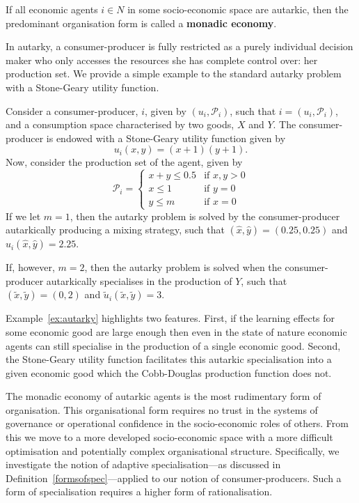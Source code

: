 \begin{subappendices}
\begin{definition}
If all economic agents $i \in N$ in some socio-economic space are autarkic, then the predominant organisation form is called a \textbf{monadic economy}.
\end{definition}
In autarky, a consumer-producer is fully restricted as a purely individual decision maker who only accesses the resources she has complete control over: her production set. We provide a simple example to the standard autarky problem with a Stone-Geary utility function.
\begin{example} \label{ex:autarky}
Consider a consumer-producer, $i$, given by $(u_{i}, \mathcal{P}_i)$, such that $i = (u_{i}, \mathcal{P}_i)$, and a consumption space characterised by two goods, $X$ and $Y$. The consumer-producer is endowed with a Stone-Geary utility function given by
\begin{equation*}
u_{i}(x, y) = (x + 1)(y + 1) .
\end{equation*}
Now, consider the production set of the agent, given by
\[ \mathcal{P}_{i} = \left\{ \begin{array}{ll}
         x + y \leqslant 0.5 & \mbox{if $x,y > 0$}\\
		 x \leqslant 1 & \mbox{if $y = 0$}\\
         y \leqslant m & \mbox{if $x = 0$}\end{array} \right. \]
If we let $m = 1$, then the autarky problem is solved by the consumer-producer autarkically producing a mixing strategy, such that $(\hat{x}, \hat{y}) = (0.25, 0.25)$ and $\hat{u}_{i}(\hat{x}, \hat{y}) = 2.25$.

If, however, $m = 2$, then the autarky problem is solved when the consumer-producer autarkically specialises in the production of $Y$, such that $(\tilde{x}, \tilde{y}) = (0, 2)$ and $\tilde{u}_{i}(\tilde{x}, \tilde{y}) = 3$.
\end{example}
Example~\ref{ex:autarky} highlights two features. First, if the learning effects for some economic good are large enough then even in the state of nature economic agents can still specialise in the production of a single economic good. Second, the Stone-Geary utility function facilitates this autarkic specialisation into a given economic good which the Cobb-Douglas production function does not.

The monadic economy of autarkic agents is the most rudimentary form of organisation. This organisational form requires no trust in the systems of governance or operational confidence in the socio-economic roles of others. From this we move to a more developed socio-economic space with a more difficult optimisation and potentially complex organisational structure. Specifically, we investigate the notion of adaptive specialisation---as discussed in Definition~\ref{formsofspec}---applied to our notion of consumer-producers. Such a form of specialisation requires a higher form of rationalisation.


\end{subappendices}
